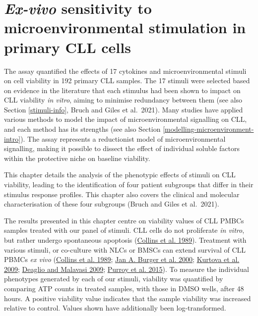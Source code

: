 \documentclass[11pt, a4paper, twosided]{book}
\begin{document}
\hypertarget{chapter4}{%
\chapter{\texorpdfstring{\emph{Ex-vivo} sensitivity to microenvironmental stimulation in primary CLL cells}{Ex-vivo sensitivity to microenvironmental stimulation in primary CLL cells}}\label{chapter4}}

The assay quantified the effects of 17 cytokines and microenvironmental stimuli on cell viability in 192 primary CLL samples. The 17 stimuli were selected based on evidence in the literature that each stimulus had been shown to impact on CLL viability \emph{in vitro}, aiming to minimise redundancy between them (see also Section \ref{stimuli-info}, Bruch and Giles et al.~2021). Many studies have applied various methods to model the impact of microenvironmental signalling on CLL, and each method has its strengths (see also Section \ref{modelling-microenvironment-intro}). The assay represents a reductionist model of microenvironmental signalling, making it possible to dissect the effect of individual soluble factors within the protective niche on baseline viability.

This chapter details the analysis of the phenotypic effects of stimuli on CLL viability, leading to the identification of four patient subgroups that differ in their stimulus response profiles. This chapter also covers the clinical and molecular characterisation of these four subgroups (Bruch and Giles et al.~2021).

The results presented in this chapter centre on viability values of CLL PMBCs samples treated with our panel of stimuli. CLL cells do not proliferate \emph{in vitro}, but rather undergo spontaneous apoptosis (\protect\hyperlink{ref-Collins1989}{Collins et al. 1989}). Treatment with various stimuli, or co-culture with NLCs or BMSCs can extend survival of CLL PBMCs \emph{ex vivo} (\protect\hyperlink{ref-Collins1989}{Collins et al. 1989}; \protect\hyperlink{ref-Burger2000}{Jan A. Burger et al. 2000}; \protect\hyperlink{ref-Kurtova2009}{Kurtova et al. 2009}; \protect\hyperlink{ref-Deaglio2009}{Deaglio and Malavasi 2009}; \protect\hyperlink{ref-Purroy2015}{Purroy et al. 2015}). To measure the individual phenotypes generated by each of our stimuli, viability was quantified by comparing ATP counts in treated samples, with those in DMSO wells, after 48 hours. A positive viability value indicates that the sample viability was increased relative to control. Values shown have additionally been log-transformed.
\end{document}
